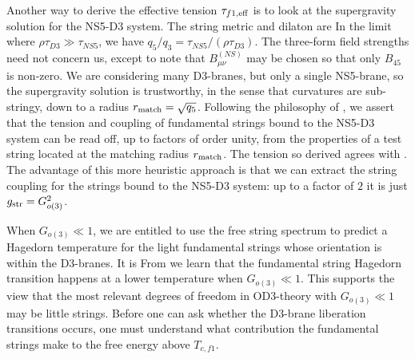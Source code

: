 Another way to derive the effective tension $\tau_{f1,\rm eff}$ is to
look at the supergravity solution for the NS5-D3 system.  The string
metric and dilaton are 
 In the limit where $\rho\tau_{D3} \gg \tau_{NS5}$, we have $q_5/q_3 =
\tau_{NS5}/(\rho \tau_{D3})$.  The three-form field strengths need not
concern us, except to note that $B_{\mu\nu}^{(NS)}$ may be chosen so
that only $B_{45}$ is non-zero.  We are considering many D3-branes,
but only a single NS5-brane, so the supergravity solution is
trustworthy, in the sense that curvatures are sub-stringy, down to a
radius $r_{\rm match} = \sqrt{q_5}$.  Following the philosophy of
\cite{hp}, we assert that the tension and coupling of fundamental
strings bound to the NS5-D3 system can be read off, up to factors of
order unity, from the properties of a test string located at the
matching radius $r_{\rm match}$.  The tension so derived agrees with
\EffectiveTauF.  The advantage of this more heuristic approach is that
we can extract the string coupling for the strings bound to the NS5-D3
system: up to a factor of $2$ it is just $g_{\rm str} = G_{o(3)}^2$.

When $G_{o(3)} \ll 1$, we are entitled to use the free string spectrum
to predict a Hagedorn temperature for the light fundamental strings
whose orientation is within the D3-branes.  It is
 From 
 we learn that the fundamental string Hagedorn transition
happens at a lower temperature when $G_{o(3)} \ll 1$.  This supports
the view that the most relevant degrees of freedom in 
OD3-theory with $G_{o(3)} \ll 1$ may be little strings.  Before one can ask
whether the D3-brane liberation transitions occurs, one must
understand what contribution the fundamental strings make to the free
energy above $T_{c,f1}$.

